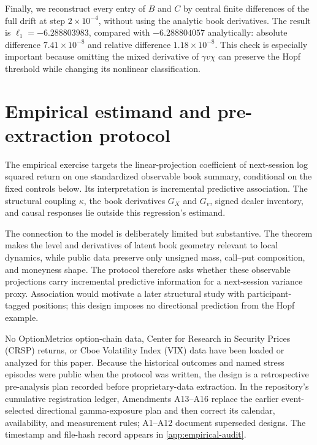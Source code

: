 \documentclass[11pt]{article}
\begin{document}
Finally, we reconstruct every entry of $B$ and $C$ by central finite differences of the
full drift at step $2\times10^{-4}$, without using the analytic book derivatives.  The
result is $\ell_1=-6.288803983$, compared with $-6.288804057$ analytically: absolute
difference $7.41\times10^{-8}$ and relative difference $1.18\times10^{-8}$.  This check is
especially important because omitting the mixed derivative of $\gamma v\chi$ can preserve
the Hopf threshold while changing its nonlinear classification.

\FloatBarrier

\section{Empirical estimand and pre-extraction protocol}
\label{sec:empirical}

The empirical exercise targets the linear-projection coefficient of next-session log
squared return on one standardized observable book summary, conditional on the fixed
controls below.  Its interpretation is incremental predictive association.  The structural
coupling $\kappa$, the book derivatives $G_X$ and $G_v$, signed dealer inventory, and causal
responses lie outside this regression's estimand.

The connection to the model is deliberately limited but substantive.  The theorem makes
the level and derivatives of latent book geometry relevant to local dynamics, while public
data preserve only unsigned mass, call--put composition, and moneyness shape.  The protocol
therefore asks whether these observable projections carry incremental predictive information
for a next-session variance proxy.  Association would motivate a later structural study with
participant-tagged positions; this design imposes no directional prediction from the Hopf
example.

No OptionMetrics option-chain data, Center for Research in Security Prices (CRSP) returns,
or Cboe Volatility Index (VIX) data have been loaded or analyzed for this paper.  Because the
historical outcomes and named stress episodes were public when the protocol was written, the
design is a retrospective pre-analysis plan recorded before proprietary-data extraction.
In the repository's cumulative registration ledger, Amendments A13--A16 replace the earlier
event-selected directional gamma-exposure plan and then correct its calendar, availability,
and measurement rules; A1--A12 document superseded designs.  The timestamp and file-hash
record appears in \cref{app:empirical-audit}.
\end{document}
